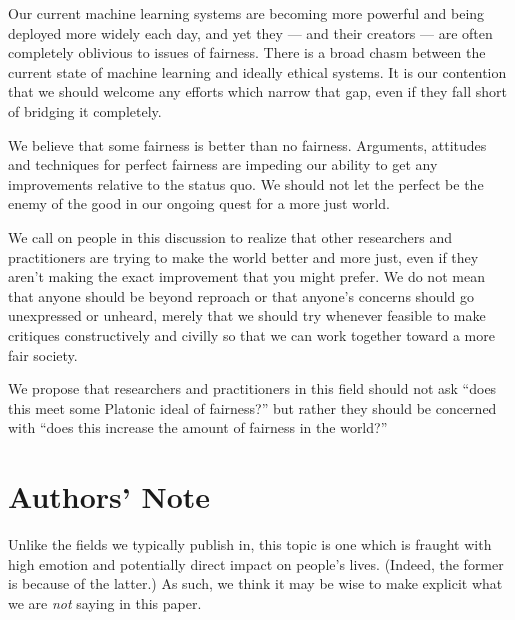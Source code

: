 \documentclass[11pt]{article}
\begin{document}
Our current machine learning systems are becoming more powerful and being deployed more widely each day, and yet they --- and their creators --- are often completely oblivious to issues of fairness. There is a broad chasm between the current state of machine learning and ideally ethical systems. It is our contention that we should welcome any efforts which narrow that gap, even if they fall short of bridging it completely. 

We believe that some fairness is better than no fairness. Arguments, attitudes and techniques for perfect fairness are impeding our ability to get any improvements relative to the status quo. We should not let the perfect be the enemy of the good in our ongoing quest for a more just world.

We call on people in this discussion to realize that other researchers and practitioners are trying to make the world better and more just, even if they aren't making the exact improvement that you might prefer. We do not mean that anyone should be beyond reproach or that anyone's concerns should go unexpressed or unheard, merely that we should try whenever feasible to make critiques constructively and civilly so that we can work together toward a more fair society.

We propose that researchers and practitioners in this field should not ask  ``does this meet some Platonic ideal of fairness?'' but rather they should be concerned with ``does this increase the amount of fairness in the world?''

\section{Authors' Note}

Unlike the fields we typically publish in, this topic is one which is fraught with high emotion and potentially direct impact on people's lives. (Indeed, the former is because of the latter.) As such, we think it may be wise to make explicit what we are \textit{not} saying in this paper.
\end{document}
